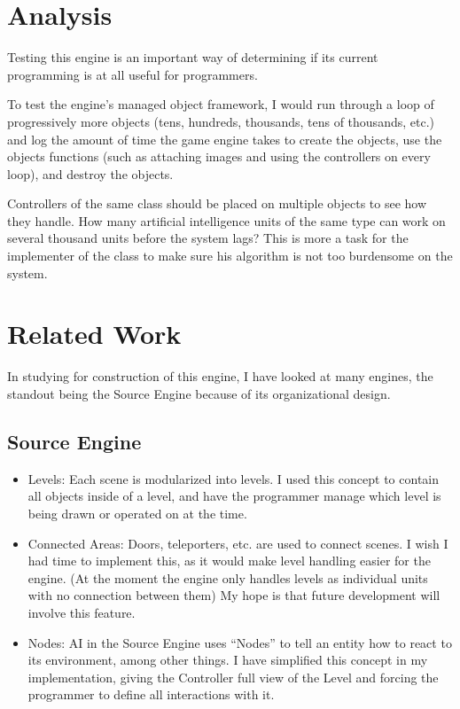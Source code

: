 \documentclass[12pt]{article}
\begin{document}
  \section{Analysis}
    Testing this engine is an important way of determining if its current programming is at all useful for programmers.

    To test the engine's managed object framework, I would run through a loop of progressively more objects (tens, hundreds, thousands, tens of thousands, etc.) and log the amount of time the game engine takes to create the objects, use the objects functions (such as attaching images and using the controllers on every loop), and destroy the objects.

    Controllers of the same class should be placed on multiple objects to see how they handle. How many artificial intelligence units of the same type can work on several thousand units before the system lags? This is more a task for the implementer of the class to make sure his algorithm is not too burdensome on the system.

  \section{Related Work}

In studying for construction of this engine, I have looked at many engines, the standout being the Source Engine because of its organizational design.

\subsection{Source Engine}
\begin{itemize}
 \item Levels: Each scene is modularized into levels. I used this concept to contain all objects inside of a level, and have the programmer manage which level is being drawn or operated on at the time.
 \item Connected Areas: Doors, teleporters, etc. are used to connect scenes. I wish I had time to implement this, as it would make level handling easier for the engine. (At the moment the engine only handles levels as individual units with no connection between them) My hope is that future development will involve this feature.
 \item Nodes: AI in the Source Engine uses ``Nodes'' to tell an entity how to react to its environment, among other things. I have simplified this concept in my implementation, giving the Controller full view of the Level and forcing the programmer to define all interactions with it.
\end{itemize}
\end{document}
